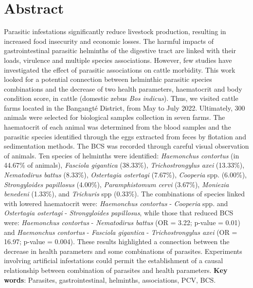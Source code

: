 \chapter*{Abstract}
Parasitic infestations significantly reduce livestock production, resulting in increased food insecurity and economic losses. The harmful impacts of gastrointestinal parasitic helminths of the digestive tract are linked with their loads, virulence and multiple species associations. However, few studies have investigated the effect of parasitic associations on cattle morbidity. This work looked for a potential connection between helminthic parasitic species combinations and the decrease of two health parameters, haematocrit and body condition score, in cattle (domestic zebus \textit{Bos indicus}). Thus, we visited cattle farms located in the Bangangté District, from May to July 2022. Ultimately, 300 animals were selected for biological samples collection in seven farms. The haematocrit of each animal was determined from the blood samples and the parasitic species identified through the eggs extracted from feces by flotation and sedimentation methods. The BCS was recorded through careful visual observation of animals. Ten species of helminths were identified: \textit{Haemonchus contortus} (in 44.67\% of animals), \textit{Fasciola gigantica} (38.33\%), \textit{Trichostrongylus axei} (13.33\%), \textit{Nematodirus battus} (8.33\%), \textit{Ostertagia ostertagi} (7.67\%), \textit{Cooperia} spp. (6.00\%), \textit{Strongyloides papillosus} (4.00\%), \textit{Paramphistomum cervi} (3.67\%), \textit{Moniezia benedeni} (1.33\%), and \textit{Trichuris} spp (0.33\%). The combinations of species linked with lowered haematocrit were: \textit{Haemonchus contortus} - \textit{Cooperia} spp. and \textit{Ostertagia ostertagi} - \textit{Strongyloides papillosus}, while those that reduced BCS were: \textit{Haemonchus contortus} - \textit{Nematodirus battus} (OR = 3.22; p-value = 0.01) and \textit{Haemonchus contortus }- \textit{Fasciola gigantica} - \textit{Trichostrongylus axei} (OR = 16.97; p-value = 0.004). These results highlighted a connection between the decrease in health parameters and some combinations of parasites. Experiments involving artificial infestations could permit the establishment of a causal relationship between combination of parasites and health parameters.
\newline
\newline
\textbf{Key words}: Parasites, gastrointestinal, helminths, associations, PCV, BCS.
